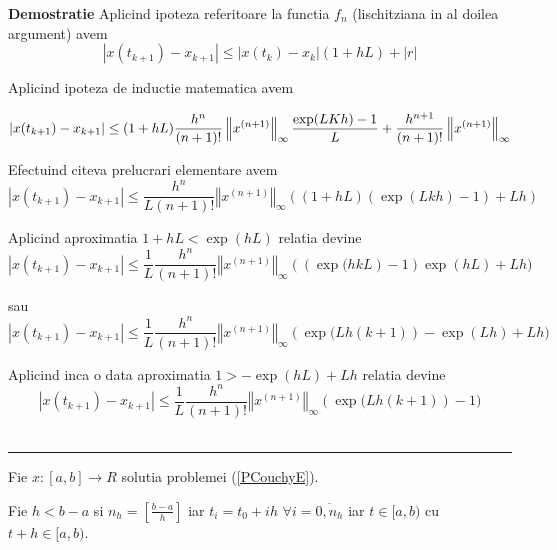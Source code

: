\documentclass[a4paper,twoside]{book}
\newenvironment{proof}[1][Proof]{\noindent\textbf{Demostratie} }{\ \rule{0.5em}{0.5em}}
\begin{document}
\begin{proof}
Aplicind ipoteza referitoare la functia $f_{n}$ (lischitziana in al doilea
argument) avem%
\begin{equation*}
\left\vert x(t_{k+1})-x_{k+1}\right\vert \leq \left\vert
x(t_{k})-x_{k}\right\vert (1+hL)+|r|
\end{equation*}

Aplicind ipoteza de inductie matematica avem

\begin{equation*}
\left\vert x(t_{k+1})-x_{k+1}\right\vert \leq (1+hL)\frac{h^{n}}{(n+1)!}%
\left\Vert x^{(n+1)}\right\Vert _{\infty }\frac{\exp (LKh)-1}{L}+\frac{%
h^{n+1}}{(n+1)!}\left\Vert x^{(n+1)}\right\Vert _{\infty }
\end{equation*}

Efectuind citeva prelucrari elementare avem%
\begin{equation*}
\left\vert x(t_{k+1})-x_{k+1}\right\vert \leq \frac{h^{n}}{L(n+1)!}%
\left\Vert x^{(n+1)}\right\Vert _{\infty }\left( \left( 1+hL\right) \left(
\exp (Lkh)-1\right) +Lh\right)
\end{equation*}

Aplicind aproximatia $1+hL<\exp (hL)$ relatia devine%
\begin{equation*}
\left\vert x(t_{k+1})-x_{k+1}\right\vert \leq \frac{1}{L}\frac{h^{n}}{(n+1)!}%
\left\Vert x^{(n+1)}\right\Vert _{\infty }\left( \left( \exp (hkL\right)
-1\right) \exp (hL)+Lh)
\end{equation*}

sau%
\begin{equation*}
\left\vert x(t_{k+1})-x_{k+1}\right\vert \leq \frac{1}{L}\frac{h^{n}}{(n+1)!}%
\left\Vert x^{(n+1)}\right\Vert _{\infty }\left( \exp (Lh(k+1)\right) -\exp
(Lh)+Lh)
\end{equation*}

Aplicind inca o data aproximatia $1>-\exp (hL)+Lh$ relatia devine%
\begin{equation*}
\left\vert x(t_{k+1})-x_{k+1}\right\vert \leq \frac{1}{L}\frac{h^{n}}{(n+1)!}%
\left\Vert x^{(n+1)}\right\Vert _{\infty }\left( \exp (Lh(k+1)\right) -1)
\end{equation*}
\end{proof}

Fie $x:[a,b]\rightarrow R$ solutia problemei (\ref{PCouchyE}).

Fie $h<b-a$ si $n_{h}=\left[ \frac{b-a}{h}\right] $ iar $t_{i}=t_{0}+ih\,\,%
\forall i=\overline{0,n_{h}}$ iar $t\in \lbrack a,b)$ cu $t+h\in \lbrack
a,b) $.
\end{document}
